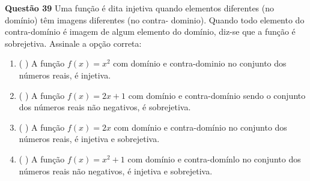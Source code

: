 {\bf Questão 39} 
 Uma função é dita injetiva quando elementos diferentes (no domínio) têm imagens diferentes (no contra-
dominio). Quando todo elemento do contra-domínio é imagem de algum elemento do domínio, diz-se que a função
é sobrejetiva. Assinale a opção correta:

\begin{enumerate}
		\item ( ) A função $f(x)= x^2$ com domínio e contra-dominio no conjunto  dos números reais, é injetiva.
		\item ( ) A função $f(x)= 2x+1$ com domínio  e contra-domínio  sendo o conjunto dos números reais não negativos, é sobrejetiva.
		\item ( ) A função $f(x)= 2x$ com domínio e contra-domínio no conjunto dos números reais, é injetiva e sobrejetiva.
		\item ( ) A função $f(x)= x^2 +1$ com domínio e contra-domínlo no conjunto dos números reais não negativos, é injetiva e sobrejetiva.
\end{enumerate}
